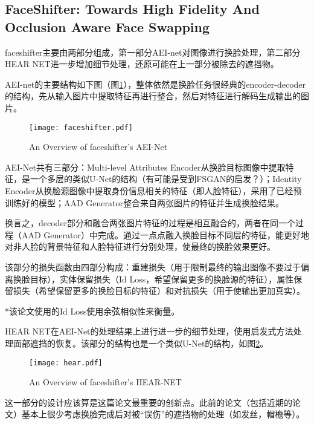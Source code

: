 \documentclass[a4paper]{article}
\begin{document}
\subsection{FaceShifter: Towards High Fidelity And Occlusion Aware Face Swapping}

faceshifter主要由两部分组成，第一部分AEI-net对图像进行换脸处理，第二部分HEAR NET进一步增加细节处理，还原可能在上一部分被除去的遮挡物。

AEI-net的主要结构如下图（图\ref{faceshifte}），整体依然是换脸任务很经典的encoder-decoder的结构，先从输入图片中提取特征再进行整合，然后对特征进行解码生成输出的图片。

\begin{figure}[htb]
  \centering
  \texttt{[image: faceshifter.pdf]}
  \caption{An Overview of faceshifter's AEI-Net \cite{faceshifter}}
  \label{faceshifte}
\end{figure}

AEI-Net共有三部分：Multi-level Attributes Encoder从换脸目标图像中提取特征，是一个多层的类似U-Net的结构（有可能是受到FSGAN的启发？）；Identity Encoder从换脸源图像中提取身份信息相关的特征（即人脸特征），采用了已经预训练好的模型；AAD Generator整合来自两张图片的特征并生成换脸结果。

换言之，decoder部分和融合两张图片特征的过程是相互融合的，两者在同一个过程（AAD Generator）中完成。通过一点点融入换脸目标不同层的特征，能更好地对非人脸的背景特征和人脸特征进行分别处理，使最终的换脸效果更好。

该部分的损失函数由四部分构成：重建损失（用于限制最终的输出图像不要过于偏离换脸目标），实体保留损失（Id Loss，希望保留更多的换脸源的特征），属性保留损失（希望保留更多的换脸目标的特征）和对抗损失（用于使输出更加真实）。

*该论文使用的Id Loss使用余弦相似性来衡量。

\vspace{1em}
HEAR NET在AEI-Net的处理结果上进行进一步的细节处理，使用启发式方法处理面部遮挡的恢复。该部分的结构也是一个类似U-Net的结构，如图\ref{hear}。

\begin{figure}[htb]
  \centering
  \texttt{[image: hear.pdf]}
  \caption{An Overview of faceshifter's HEAR-NET \cite{faceshifter}}
  \label{hear}
\end{figure}

这一部分的设计应该算是这篇论文最重要的创新点。此前的论文（包括近期的论文）基本上很少考虑换脸完成后对被“误伤”的遮挡物的处理（如发丝，帽檐等）。
\end{document}
